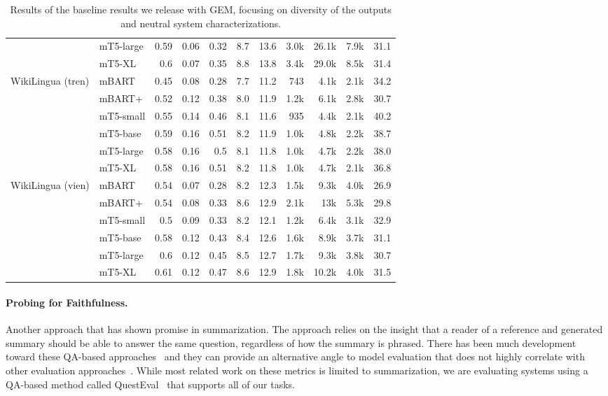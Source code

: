\documentclass[11pt,a4paper]{article}
\newcommand{\GEM}{\textsc{GEM}}
\begin{document}
\begin{table*}[!htbp]
\begin{tabular}{@{}llrrrrrrrrr@{}}
 & \small{mT5-large} & 0.59 & 0.06 & 0.32 & 8.7 & 13.6 & 3.0k & 26.1k & 7.9k & 31.1 \\
 & \small{mT5-XL} & 0.6 & 0.07 & 0.35 & 8.8 & 13.8 & 3.4k & 29.0k & 8.5k & 31.4 \\
\multirow{2}{*}{WikiLingua (tren)} & \small{mBART} & 0.45 & 0.08 & 0.28 & 7.7 & 11.2 & 743 & 4.1k & 2.1k & 34.2 \\
 & \small{mBART+} & 0.52 & 0.12 & 0.38 & 8.0 & 11.9 & 1.2k & 6.1k & 2.8k & 30.7 \\
  & \small{mT5-small} & 0.55 & 0.14 & 0.46 & 8.1 & 11.6 & 935 & 4.4k & 2.1k & 40.2 \\
 & \small{mT5-base} & 0.59 & 0.16 & 0.51 & 8.2 & 11.9 & 1.0k & 4.8k & 2.2k & 38.7 \\
 & \small{mT5-large} & 0.58 & 0.16 & 0.5 & 8.1 & 11.8 & 1.0k & 4.7k & 2.2k & 38.0 \\
 & \small{mT5-XL} & 0.58 & 0.16 & 0.51 & 8.2 & 11.8 & 1.0k & 4.7k & 2.1k & 36.8 \\
\multirow{2}{*}{WikiLingua (vien)} & \small{mBART} & 0.54 & 0.07 & 0.28 & 8.2 & 12.3 & 1.5k & 9.3k & 4.0k & 26.9  \\
 & \small{mBART+} & 0.54 & 0.08 & 0.33 & 8.6 & 12.9 & 2.1k  & 13k & 5.3k & 29.8 \\
 & \small{mT5-small} & 0.5 & 0.09 & 0.33 & 8.2 & 12.1 & 1.2k & 6.4k & 3.1k & 32.9 \\
 & \small{mT5-base} & 0.58 & 0.12 & 0.43 & 8.4 & 12.6 & 1.6k & 8.9k & 3.7k & 31.1 \\
 & \small{mT5-large} & 0.6 & 0.12 & 0.45 & 8.5 & 12.7 & 1.7k & 9.3k & 3.8k & 30.7 \\
 & \small{mT5-XL} & 0.61 & 0.12 & 0.47 & 8.6 & 12.9 & 1.8k & 10.2k & 4.0k & 31.5 \\
\bottomrule
\end{tabular}
\caption{Results of the baseline results we release with \GEM, focusing on diversity of the outputs and neutral system characterizations.}
\label{tab:result2}
\end{table*}

\paragraph{Probing for Faithfulness.} Another approach that has shown promise in summarization. The approach relies on the insight that a reader of a reference and generated summary should be able to answer the same question, regardless of how the summary is phrased. There has been much development toward these QA-based approaches~\citep[][among others]{eyal2019question,scialom-2019-answers,durmus-2020-feqa,wang-2020-asking} and they can provide an alternative angle to model evaluation that does not highly correlate with other evaluation approaches~\citep{fabbri2020summeval}. While most related work on these metrics is limited to summarization, we are evaluating systems using a QA-based method called QuestEval~\citep{scialom2020SAFEval} that supports all of our tasks. 
\end{document}
